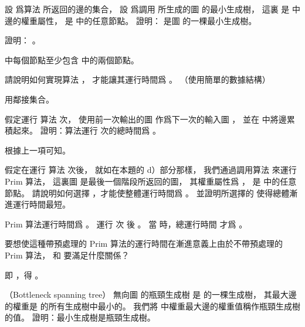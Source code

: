 \startigBase[a]\startitem
設  爲算法  所返回的邊的集合，
設  爲調用  所生成的圖  的最小生成樹，
這裏  是  中邊的權重屬性，
  是  中的任意節點。
證明：  是圖  的一棵最小生成樹。
\stopitem\stopigBase

\startANSWER
{}
\stopANSWER

\startigBase[continue]\startitem
證明： 。
\stopitem\stopigBase

\startANSWER
{} 中每個節點至少包含  中的兩個節點。
\stopANSWER

\startigBase[continue]\startitem
請說明如何實現算法 ，
才能讓其運行時間爲 。
（\hint 使用簡單的數據結構）
\stopitem\stopigBase

\startANSWER
用鄰接集合。
\stopANSWER

\startigBase[continue]\startitem
假定運行  算法  次，
使用前一次輸出的圖  作爲下一次的輸入圖 ，
並在  中將邊累積起來。
證明：算法運行  次的總時間爲 。
\stopitem\stopigBase

\startANSWER
根據上一項可知。
\stopANSWER

\startigBase[continue]\startitem
假定在運行  算法  次後，
就如在本題的 d）部分那樣，
我們通過調用算法  來運行 Prim 算法，
這裏圖  是最後一個階段所返回的圖，
其權重屬性爲 ，  是  中的任意節點。
請說明如何選擇 ，才能使整體運行時間爲 。
並證明所選擇的  使得總體漸進運行時間最短。
\stopitem\stopigBase

\startANSWER
Prim 算法運行時間爲 。
運行  次  後 。
當  時，總運行時間  才爲 。
\stopANSWER

\startigBase[continue]\startitem
要想使這種帶預處理的 Prim 算法的運行時間在漸進意義上由於不帶預處理的 Prim 算法，
  和  要滿足什麼關係？
\stopitem\stopigBase

\startANSWER
即 ，得 。
\stopANSWER

\stopPROBLEM

\startPROBLEM
（Bottleneck spanning tree）
無向圖  的{\EMP 瓶頸生成樹}  是  的一棵生成樹，
其最大邊的權重是  的所有生成樹中最小的。
我們將  中權重最大邊的權重值稱作瓶頸生成樹  的值。
\startigBase[a]\startitem
證明：最小生成樹是瓶頸生成樹。
\stopitem\stopigBase

